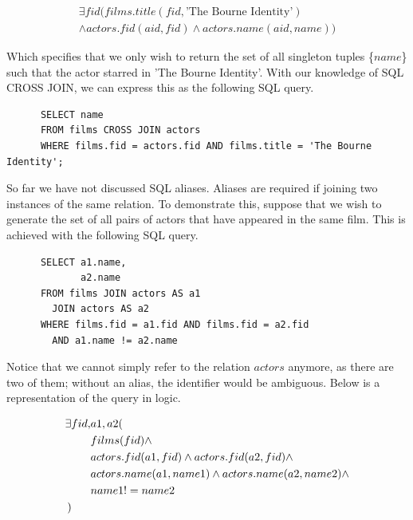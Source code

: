 \documentclass[a4paper, 11pt]{article}
\begin{document}
      \begin{gather}
        \exists fid(films.title(fid, \text{'The Bourne Identity'}) \nonumber\\
        \land actors.fid(aid, fid) \land actors.name(aid, name))
      \end{gather}

      Which specifies that we only wish to return the set of all singleton
      tuples \{$name$\} such that the actor starred in 'The Bourne Identity'.
      With our knowledge of SQL CROSS JOIN, we can express this as the
      following SQL query.

      \begin{verbatim}
      SELECT name
      FROM films CROSS JOIN actors
      WHERE films.fid = actors.fid AND films.title = 'The Bourne Identity';
      \end{verbatim}

      So far we have not discussed SQL aliases. Aliases are required if joining
      two instances of the same relation. To demonstrate this, suppose that we
      wish to generate the set of all pairs of actors that have appeared in the
      same film. This is achieved with the following SQL query.

      \begin{verbatim}
      SELECT a1.name,
             a2.name
      FROM films JOIN actors AS a1
        JOIN actors AS a2
      WHERE films.fid = a1.fid AND films.fid = a2.fid 
        AND a1.name != a2.name
      \end{verbatim}

      Notice that we cannot simply refer to the relation $actors$ anymore, as
      there are two of them; without an alias, the identifier would be
      ambiguous. Below is a representation of the query in logic.

      \begin{align}
        \label{largeCROSS}
          \exists fid, & a1, a2(  \nonumber\\
                       & films(fid) \land \nonumber\\
                       & actors.fid(a1, fid) \land actors.fid(a2, fid) \land \nonumber\\
                       & actors.name(a1, name1) \land actors.name(a2, name2) \land \nonumber\\
                       & name1 != name2 \nonumber\\
        ) \hspace{6mm} &  %
      \end{align}
\end{document}
